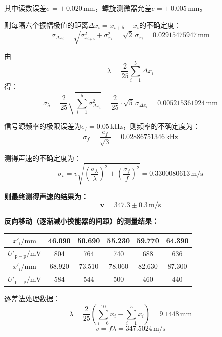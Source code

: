 \documentclass[a4paper,fontset=windows]{ctexart}
\begin{document}
    其中读数误差$\sigma = \pm\,0.020\,\mathrm{mm}$，螺旋测微器允差$e = \pm\,0.005\,\mathrm{mm}$。

    则每隔六个振幅极值的距离$\Delta x_i = x_{i+5}-x_i$的不确定度：
    \[
    \sigma_{\Delta x_i} = \sqrt{\sigma_{x_{i+5}}^2 + \sigma_{x_i}^2} = \sqrt{2}\,\sigma_{x_i} = 0.02915475947\,\mathrm{mm}
    \]

    由
    \[
    \lambda = \frac{2}{25}\sum_{i=1}^{5}\Delta x_i
    \]
    得：
    \[
    \sigma_{\lambda} = \frac{2}{25}\sqrt{\sum_{i=1}^{5}\sigma_{\Delta x_i}^2} = \frac{2}{25}\cdot\sqrt{5}\,\sigma_{\Delta x_i} = 0.005215361924\,\mathrm{mm}
    \]

    信号源频率的极限误差为$e_f = 0.05\,\mathrm{kHz}$，则频率的不确定度为：
    \[
    \sigma_f = \frac{e_f}{\sqrt{3}} = 0.02886751346\,\mathrm{kHz}
    \]

    测得声速的不确定度为：
    \[
    \sigma_v = v\sqrt{\left(\frac{\sigma_{\lambda}}{\lambda}\right)^2 + \left(\frac{\sigma_f}{f}\right)^2} = 0.3300080613\,\mathrm{m/s}
    \]

    \textbf{则最终测得声速的结果为：}
    \[
    \boldsymbol{v = 347.3\pm0.3\,\mathrm{m/s}}
    \]

    \newpage
    \textbf{反向移动（逐渐减小换能器的间距）的测量结果：}

    \vspace{0.5em}\begin{table}[ht!]\Large
        \begin{center}
            \begin{tabular}{ |c|c|c|c|c|c| }
                \hline
                $x'_i/\mathrm{mm}$ & 46.090 & 50.690 & 55.230 & 59.770 & 64.390 \\
                \hline
                $U'_\mathrm{p-p}/\mathrm{mV}$ & 804 & 764 & 740 & 688 & 636 \\
                \hline
                $x'_i/\mathrm{mm}$ & 68.920 & 73.510 & 78.060 & 82.630 & 87.300 \\
                \hline
                $U'_\mathrm{p-p}/\mathrm{mV}$ & 584 & 544 & 500 & 460 & 440 \\
                \hline
            \end{tabular}
        \end{center}
    \end{table}\vspace{-0.5em}

    逐差法处理数据：
    \[
    \lambda = \frac{2}{25}\left(\sum\limits_{i=6}^{10}x_i - \sum\limits_{i=1}^{5}x_i\right) = 9.1448\,\mathrm{mm}
    \]
    \[
    v = f\lambda = 347.5024\,\mathrm{m/s}
    \]
\end{document}
